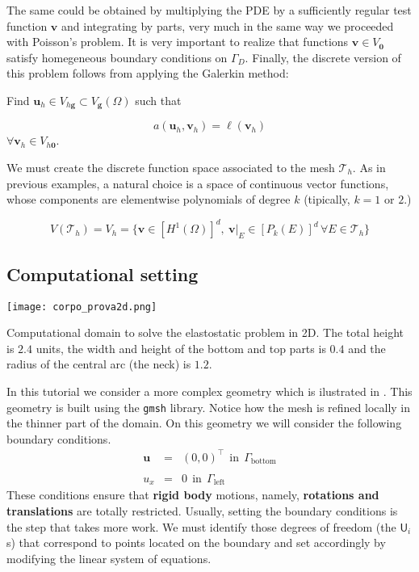 The same could be obtained by multiplying the PDE by a sufficiently regular test
function $\mathbf{v}$ and integrating by parts, very much in the same way we 
proceeded with Poisson's problem.
It is very important to realize that functions $\mathbf{v} \in V_{\mathbf{0}}$ 
satisfy homegeneous boundary conditions on $\Gamma_D$.
Finally, the discrete version of this problem follows from applying 
the Galerkin method: 

\begin{kaobox}[backgroundcolor={blue!10!white}]
Find $\mathbf{u}_h \in V_{h\mathbf{g}} \subset V_{\mathbf{g}}(\Omega)$ such that

\begin{equation}
a(\mathbf{u}_h,\mathbf{v}_h) = \ell(\mathbf{v}_h) \nonumber
\end{equation}
$ \forall \mathbf{v}_h \in V_{h\mathbf{0}}$.

\end{kaobox}

We must create the discrete function space associated to the mesh $\mathcal{T}_h$. As in previous examples, a natural choice is a space of continuous vector functions, whose components 
are elementwise polynomials of degree $k$ (tipically, $k=1$ or $2$.)

$$
V(\mathcal{T}_h) = V_h = \{\mathbf{v} \in [H^1(\Omega)]^d,~\mathbf{v}|_E \in [P_k(E)]^d \, \forall E \in \mathcal{T}_h\}
$$

\subsection{Computational setting}

\begin{marginfigure}[-2.0cm]
\texttt{[image: corpo\_prova2d.png]}
\caption[]{Computational domain to solve the elastostatic problem in 2D.
	The total height is $2.4$ units, the width and height of the bottom and top parts is $0.4$
	and the radius of the central arc (the neck) is $1.2$.}
\end{marginfigure}
In this tutorial we consider a more complex geometry which is ilustrated in 
. This geometry is built using the \texttt{gmsh} library.
Notice how the mesh is refined locally in the thinner part of the domain.
On this geometry we will consider the following boundary conditions.
\begin{eqnarray}
\mathbf{u} & = & (0,0)^{\intercal} ~~\mbox{in}~~\Gamma_{\mbox{bottom}} \nonumber \\
& & \nonumber \\
u_x & = & 0~~\mbox{in}~~\Gamma_{\mbox{left}}\nonumber
\end{eqnarray}
These conditions ensure that \textbf{rigid body} motions, namely, \textbf{rotations and translations} are totally restricted. Usually, setting the boundary conditions is the step that takes more work. We must identify those degrees of freedom (the $\mathsf{U}_i$s) that correspond to points
located on the boundary and set accordingly by modifying the linear system of equations. 

